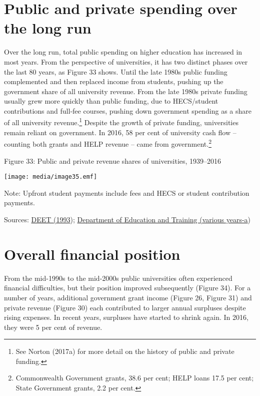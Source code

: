 \documentclass[]{book}
\begin{document}
\hypertarget{public-and-private-spending-over-the-long-run}{%
\section{Public and private spending over the long run}\label{public-and-private-spending-over-the-long-run}}

Over the long run, total public spending on higher education has increased in most years. From the perspective of universities, it has two distinct phases over the last 80 years, as Figure 33 shows. Until the late 1980s public funding complemented and then replaced income from students, pushing up the government share of all university revenue. From the late 1980s private funding usually grew more quickly than public funding, due to HECS/student contributions and full-fee courses, pushing down government spending as a share of all university revenue.\footnote{See Norton (2017a) for more detail on the history of public and private funding.} Despite the growth of private funding, universities remain reliant on government. In 2016, 58 per cent of university cash flow -- counting both grants and HELP revenue -- came from government.\footnote{Commonwealth Government grants, 38.6 per cent; HELP loans 17.5 per cent; State Government grants, 2.2 per cent.}

\protect\hypertarget{_Ref398226881}{}{}Figure 33: Public and private revenue shares of universities, 1939--2016

\texttt{[image: media/image35.emf]}

Note: Upfront student payments include fees and HECS or student contribution payments.

Sources: \protect\hyperlink{_ENREF_56}{DEET (1993}); \protect\hyperlink{_ENREF_88}{Department of Education and Training (various years-a})

\hypertarget{overall-financial-position}{%
\section{Overall financial position }\label{overall-financial-position}}

From the mid-1990s to the mid-2000s public universities often experienced financial difficulties, but their position improved subsequently (Figure 34). For a number of years, additional government grant income (Figure 26, Figure 31) and private revenue (Figure 30) each contributed to larger annual surpluses despite rising expenses. In recent years, surpluses have started to shrink again. In 2016, they were 5 per cent of revenue.
\end{document}
